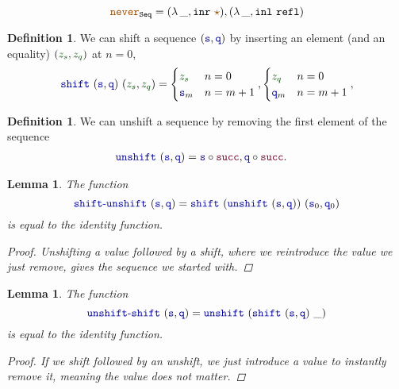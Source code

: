 \documentclass[twoside,11pt,openright]{report}
\theoremstyle{plain} %
\newtheorem{lem}[thm]{Lemma}
\theoremstyle{definition}
\newtheorem{defn}[thm]{Definition}%
\theoremstyle{remark}
\newcommand*{\term}[1]{\textcolor{green!30!black}{#1}} %
\newcommand*{\constant}[1]{\textcolor{orange!60!black}{\ensuremath{\mathtt{#1}}}}
\newcommand*{\function}[1]{\textcolor{blue!60!black}{\ensuremath{\mathtt{#1}}}}
\newcommand*{\constructor}[1]{\textcolor{purple!60!black}{\ensuremath{\mathtt{#1}}}}
\newcommand*{\typeformer}[1]{\ensuremath{\mathtt{#1}}}
\newcommand*{\unitelem}{\constant{\star}} %
\begin{document}
\begin{equation}
  \constant{never}_{\typeformer{Seq}} = (\lambda\,\_, \mathtt{inr}~\unitelem) , (\lambda\,\_, \mathtt{inl}~\mathtt{refl})
\end{equation}
\begin{defn}
  We can shift a sequence \((\function{s},\function{q})\) by inserting an element (and an equality) \((\term{z_s},\term{z_q})\) at \(n = 0\),
  \begin{equation}
    \function{shift}~(\function{s} , \function{q})~(\term{z_s} , \term{z_q}) = \begin{cases} \term{z_s} & n = 0 \\ \function{s}_m & n = m + 1 \end{cases} , \begin{cases} \term{z_q} & n = 0\\ \function{q}_m & n = m + 1 \end{cases},
  \end{equation}
\end{defn}
\begin{defn}
  We can unshift a sequence by removing the first element of the sequence
  \begin{equation}
    \begin{aligned}
      \function{unshift}&~(\function{s} , \function{q}) = \function{s} \circ \constructor{succ} , \function{q} \circ \constructor{succ}.
    \end{aligned}
  \end{equation}
\end{defn}
\begin{lem}
  The function
  \begin{equation}
    \function{shift\text{-}unshift}~(\function{s},\function{q}) = \function{shift}~(\function{unshift}~(\function{s},\function{q}))~(\function{s}_0,\function{q}_0)
  \end{equation}
  is equal to the identity function.
  \begin{proof}
    Unshifting a value followed by a shift, where we reintroduce the value we just remove, gives the sequence we started  with.
  \end{proof}
\end{lem}
\begin{lem}
  The function
  \begin{equation}
    \function{unshift\text{-}shift}~(\function{s},\function{q})=\function{unshift}~(\function{shift}~(\function{s},\function{q})~\_)
  \end{equation}
  is equal to the identity function.
  \begin{proof}
    If we shift followed by an unshift, we just introduce a value to instantly remove it, meaning the value does not matter.
  \end{proof}
\end{lem}
\end{document}
